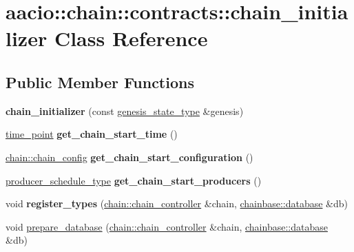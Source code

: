 \hypertarget{classaacio_1_1chain_1_1contracts_1_1chain__initializer}{}\section{aacio\+:\+:chain\+:\+:contracts\+:\+:chain\+\_\+initializer Class Reference}
\label{classaacio_1_1chain_1_1contracts_1_1chain__initializer}
\subsection*{Public Member Functions}
\begin{DoxyCompactItemize}
\item 
\mbox{\label{classaacio_1_1chain_1_1contracts_1_1chain__initializer_a2efb8bc3774ff10a2d85887812ac654d}} 
{\bfseries chain\+\_\+initializer} (const \mbox{\hyperlink{structaacio_1_1chain_1_1contracts_1_1genesis__state__type}{genesis\+\_\+state\+\_\+type}} \&genesis)
\item 
\mbox{\label{classaacio_1_1chain_1_1contracts_1_1chain__initializer_a33385719264300755502b67f23072014}} 
\mbox{\hyperlink{classfc_1_1time__point}{time\+\_\+point}} {\bfseries get\+\_\+chain\+\_\+start\+\_\+time} ()
\item 
\mbox{\label{classaacio_1_1chain_1_1contracts_1_1chain__initializer_a55b2b3f00e55e802b2867a959bdd0d66}} 
\mbox{\hyperlink{structaacio_1_1chain_1_1chain__config}{chain\+::chain\+\_\+config}} {\bfseries get\+\_\+chain\+\_\+start\+\_\+configuration} ()
\item 
\mbox{\label{classaacio_1_1chain_1_1contracts_1_1chain__initializer_a3e6a27bb003312c801e815d498c71b0a}} 
\mbox{\hyperlink{structaacio_1_1chain_1_1producer__schedule__type}{producer\+\_\+schedule\+\_\+type}} {\bfseries get\+\_\+chain\+\_\+start\+\_\+producers} ()
\item 
\mbox{\label{classaacio_1_1chain_1_1contracts_1_1chain__initializer_ac3300e3263f479144bf4ff5c018981d9}} 
void {\bfseries register\+\_\+types} (\mbox{\hyperlink{classaacio_1_1chain_1_1chain__controller}{chain\+::chain\+\_\+controller}} \&chain, \mbox{\hyperlink{classchainbase_1_1database}{chainbase\+::database}} \&db)
\item 
void \mbox{\hyperlink{classaacio_1_1chain_1_1contracts_1_1chain__initializer_a6986df6ae1b4a8954bd31e4d84527d65}{prepare\+\_\+database}} (\mbox{\hyperlink{classaacio_1_1chain_1_1chain__controller}{chain\+::chain\+\_\+controller}} \&chain, \mbox{\hyperlink{classchainbase_1_1database}{chainbase\+::database}} \&db)
\end{DoxyCompactItemize}
